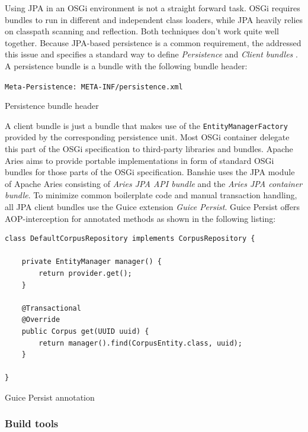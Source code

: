 Using \gls{JPA} in an \gls{OSGi} environment is not a straight forward task. \gls{OSGi} requires bundles to run in different and independent class loaders, while \gls{JPA} heavily relies on classpath scanning and reflection. Both techniques don't work quite well together. Because \gls{JPA}-based persistence is a common requirement, the  addressed this issue and specifies a standard way to define \textit{Persistence} and \textit{Client bundles} \cite{OSGI:Enterprise}. A persistence bundle is a bundle with the following bundle header:

\begin{listing}[H]
\texttt{Meta-Persistence: META-INF/persistence.xml}
\caption{Persistence bundle header}
\end{listing}

A client bundle is just a bundle that makes use of the \texttt{EntityManagerFactory} provided by the corresponding persistence unit. Most \gls{OSGi} container delegate this part of the \gls{OSGi} specification to third-party libraries and bundles. Apache Aries aims to provide portable implementations in form of standard \gls{OSGi} bundles for those parts of the \gls{OSGi} specification. Banshie uses the JPA module of Apache Aries consisting of \textit{Aries JPA API bundle} and the \textit{Aries JPA container bundle}. To minimize common boilerplate code and manual transaction handling, all \gls{JPA} client bundles use the Guice extension \textit{Guice Persist}. Guice Persist offers AOP-interception for annotated methods as shown in the following listing:

\begin{listing}[H]
\begin{verbatim}
class DefaultCorpusRepository implements CorpusRepository {

    private EntityManager manager() {
        return provider.get();
    }

    @Transactional
    @Override
    public Corpus get(UUID uuid) {
        return manager().find(CorpusEntity.class, uuid);
    }

}
\end{verbatim}
\caption{Guice Persist annotation}
\end{listing}

\subsubsection{Build tools}
